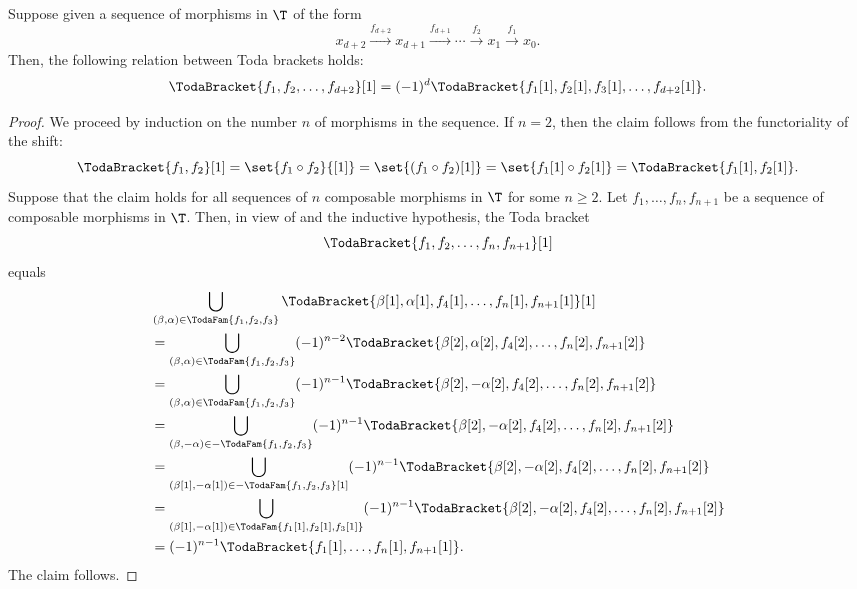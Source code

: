\documentclass[a4paper]{amsart}
\begin{document}
\begin{lemma}
  \label{lemma:TodaBracket_shift}
  Suppose given a sequence of morphisms in $\T$ of the form
  \[
    x_{d+2}\xrightarrow{f_{d+2}}x_{d+1}\xrightarrow{f_{d+1}}\cdots\xrightarrow{f_2}x_1\xrightarrow{f_1}x_0.
  \]
  Then, the following relation between Toda brackets holds:
  \[
    \TodaBracket{f_1,f_2,\dots,f_{d+2}}[1]=(-1)^d\TodaBracket{f_1[1],f_2[1],f_3[1],\dots,f_{d+2}[1]}.
  \]
\end{lemma}
\begin{proof}
  We proceed by induction on the number $n$ of morphisms in the sequence. If
  $n=2$, then the claim follows from the functoriality of the shift:
  \[
    \TodaBracket{f_1,f_2}[1]=\set{f_1\circ f_2}{[1]}=\set{(f_1\circ
      f_2)[1]}=\set{f_1[1]\circ f_2[1]}=\TodaBracket{f_1[1],f_2[1]}.
  \]
  Suppose that the claim holds for all sequences of $n$ composable morphisms in
  $\T$ for some $n\geq 2$. Let $f_1,\dots,f_n,f_{n+1}$ be a sequence of
  composable morphisms in $\T$. Then, in view of
   and the inductive
  hypothesis, the Toda bracket
  \[
    \TodaBracket{f_1,f_2,\dots,f_n,f_{n+1}}[1]
  \]
  equals
  \begin{align*}
    & \bigcup_{(\beta,\alpha)\in\TodaFam{f_1,f_2,f_3}}\TodaBracket{\beta[1],\alpha[1],f_4[1],\dots,f_n[1],f_{n+1}[1]}[1]                          \\
    & =\bigcup_{(\beta,\alpha)\in\TodaFam{f_1,f_2,f_3}}(-1)^{n-2}\TodaBracket{\beta[2],\alpha[2],f_4[2],\dots,f_n[2],f_{n+1}[2]}                  \\
    & =\bigcup_{(\beta,\alpha)\in\TodaFam{f_1,f_2,f_3}}(-1)^{n-1}\TodaBracket{\beta[2],-\alpha[2],f_4[2],\dots,f_n[2],f_{n+1}[2]}                 \\
    & =\bigcup_{(\beta,-\alpha)\in-\TodaFam{f_1,f_2,f_3}}(-1)^{n-1}\TodaBracket{\beta[2],-\alpha[2],f_4[2],\dots,f_n[2],f_{n+1}[2]}               \\
    & =\bigcup_{(\beta[1],-\alpha[1])\in-\TodaFam{f_1,f_2,f_3}[1]}(-1)^{n-1}\TodaBracket{\beta[2],-\alpha[2],f_4[2],\dots,f_n[2],f_{n+1}[2]}      \\
    & =\bigcup_{(\beta[1],-\alpha[1])\in\TodaFam{f_1[1],f_2[1],f_3[1]}}(-1)^{n-1}\TodaBracket{\beta[2],-\alpha[2],f_4[2],\dots,f_n[2],f_{n+1}[2]} \\
    & =(-1)^{n-1}\TodaBracket{f_1[1],\dots,f_n[1],f_{n+1}[1]}.
  \end{align*}
  The claim follows.
\end{proof}
\end{document}
